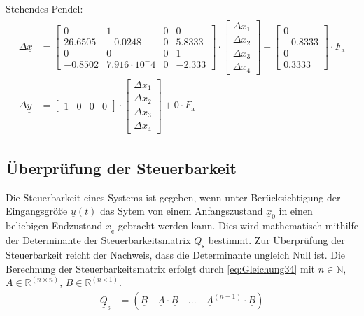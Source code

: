\documentclass[
	pagesize,
	fontsize=12pt,
	paper=a4,
	oneside,
   reqno
]{scrartcl}
\begin{document}
Stehendes Pendel:
\begin{align}\label{eq:Gleichung33}
    \begin{split}
        \Delta{\dot{\underline{x}}}&=
        \begin{bmatrix}
            0 & 1 & 0 & 0 \\
            26.6505 & -0.0248 & 0 & 5.8333 \\
            0 & 0 & 0 & 1 \\
            -0.8502 & 7.916\cdot10^-4 & 0 & -2.333
        \end{bmatrix}\cdot
        \begin{bmatrix}
            \Delta{x_{\mathrm{1}}} \\ \Delta{x_{\mathrm{2}}} \\         \Delta{x_{\mathrm{3}}} \\ \Delta{x_{\mathrm{4}}}
        \end{bmatrix}+
        \begin{bmatrix}
            0 \\
            -0.8333 \\
            0 \\
            0.3333
        \end{bmatrix}\cdot F_{\mathrm{a}}
        \\
        \Delta{\underline{y}} &=
        \begin{bmatrix}
            1 & 0 & 0 & 0
        \end{bmatrix}\cdot
        \begin{bmatrix}
            \Delta{x_{\mathrm{1}}}\\
            \Delta{x_{\mathrm{2}}}\\
            \Delta{x_{\mathrm{3}}}\\
            \Delta{x_{\mathrm{4}}}
        \end{bmatrix}+\underline{0}\cdot F_{\mathrm{a}}
    \end{split}
\end{align}

\clearpage

\subsection{Überprüfung der Steuerbarkeit} \label{sec:Steuerbarkeit}
Die Steuerbarkeit eines Systems ist gegeben, wenn unter Berücksichtigung der Eingangsgröße $\underline{u}(t)$ das Sytem von einem Anfangszustand $\underline{x}_{\mathrm{0}}$ in einen beliebigen Endzustand $\underline{x}_{\mathrm{e}}$ gebracht werden kann. Dies wird mathematisch mithilfe der Determinante der Steuerbarkeitsmatrix $Q_{\mathrm{s}}$ bestimmt. Zur Überprüfung der Steuerbarkeit reicht der Nachweis, dass die Determinante ungleich Null ist. Die Berechnung der Steuerbarkeitsmatrix erfolgt durch \autoref{eq:Gleichung34} mit $n\in\mathbb{N}$, $A\in\mathbb{R}^{(n\times n)}$, $B\in\mathbb{R}^{(n\times 1)}$.\\
\begin{align}\label{eq:Gleichung34}
    \underline{Q}_{\mathrm{s}} &= \left(\underline{B} \quad \underline{A}\cdot\underline{B} \quad ... \quad \underline{A}^{(n-1)}\cdot\underline{B}\right)
\end{align}
\end{document}

